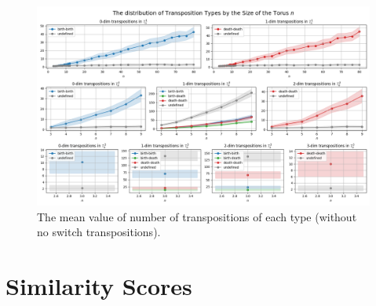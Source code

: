 \documentclass{article}
\begin{document}
\begin{figure}[h!]
    \hspace*{-3cm}
    \centering
    \includegraphics[width=1.5\textwidth]{pics/torus-transpositions/switch-types (without no switch).png}
    \caption{The mean value of number of transpositions of each type (without no switch transpositions).}
    \label{fig:switch-without-noswitch}
\end{figure}



\section{Similarity Scores}
\end{document}
